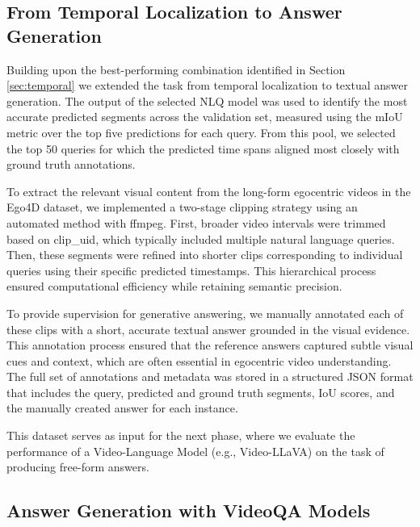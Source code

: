 \documentclass[10pt,twocolumn,letterpaper]{article}
\begin{document}
		
\subsection{From Temporal Localization to Answer Generation}
	
Building upon the best-performing combination identified in Section \ref{sec:temporal} we extended the task from temporal localization to textual answer generation. The output of the selected NLQ model was used to identify the most accurate predicted segments across the validation set, measured using the mIoU metric over the top five predictions for each query. From this pool, we selected the top 50 queries for which the predicted time spans aligned most closely with ground truth annotations.
	
To extract the relevant visual content from the long-form egocentric videos in the Ego4D dataset, we implemented a two-stage clipping strategy using an automated method with ffmpeg. First, broader video intervals were trimmed based on clip\_uid, which typically included multiple natural language queries. Then, these segments were refined into shorter clips corresponding to individual queries using their specific predicted timestamps. This hierarchical process ensured computational efficiency while retaining semantic precision.
	
To provide supervision for generative answering, we manually annotated each of these clips with a short, accurate textual answer grounded in the visual evidence. This annotation process ensured that the reference answers captured subtle visual cues and context, which are often essential in egocentric video understanding. The full set of annotations and metadata was stored in a structured JSON format that includes the query, predicted and ground truth segments, IoU scores, and the manually created answer for each instance.
	
This dataset serves as input for the next phase, where we evaluate the performance of a Video-Language Model (e.g., Video-LLaVA) on the task of producing free-form answers.
		

	
	
	
\subsection{Answer Generation with VideoQA Models}
	
\end{document}
